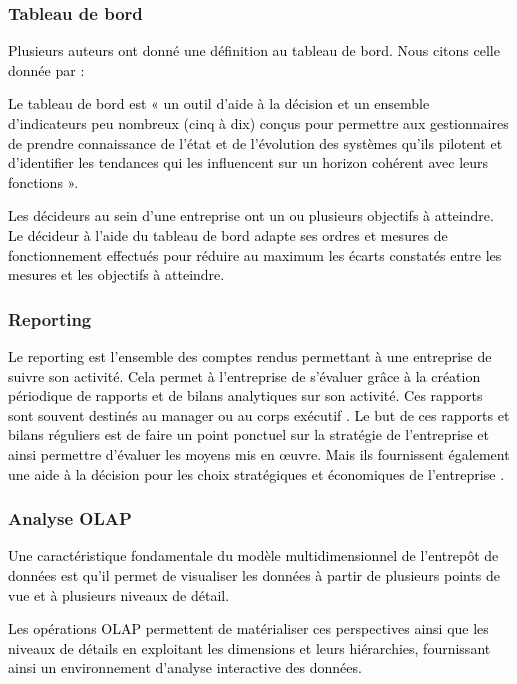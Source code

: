 \documentclass[a4paper,12pt]{report}
\begin{document}
\subsubsection{Tableau de bord}
\textcolor{black}{Plusieurs auteurs ont donné une définition au tableau de bord. Nous citons celle donnée par \citep{berland2004mesurer}:}

\textcolor{black}{Le tableau de bord est « un outil d’aide à la décision et  un ensemble d’indicateurs peu nombreux (cinq à dix) conçus pour permettre aux gestionnaires de prendre connaissance de  l’état et de l’évolution des  systèmes qu’ils pilotent et d’identifier les tendances qui les  influencent sur un horizon cohérent avec leurs fonctions ».}

\textcolor{black}{Les décideurs au sein d’une entreprise ont un ou plusieurs objectifs à atteindre. Le décideur à l’aide du tableau de bord adapte ses ordres et mesures de fonctionnement effectués pour réduire au maximum les écarts constatés entre les mesures et les objectifs à atteindre.}

\subsubsection{Reporting}
\textcolor{black}{Le reporting est l’ensemble des comptes rendus permettant à une entreprise de suivre  son activité. Cela permet à l’entreprise de s’évaluer grâce à la création périodique de  rapports et de bilans analytiques sur son activité. Ces rapports sont souvent destinés au  manager ou au corps exécutif \citep{polet12infor}.}
\textcolor{black}{Le but de ces rapports et bilans réguliers est de faire un point ponctuel sur la  stratégie de l’entreprise et ainsi permettre d’évaluer les moyens mis en œuvre. Mais ils fournissent également une aide à la décision pour les choix stratégiques et économiques de l’entreprise \citep{polet12infor}.}
\subsubsection{Analyse OLAP }
\textcolor{black}{Une caractéristique fondamentale du modèle multidimensionnel de l’entrepôt de données est qu'il permet de visualiser les données à partir de plusieurs points de vue et à plusieurs niveaux de détail.}

\textcolor{black}{Les opérations OLAP permettent de matérialiser ces perspectives ainsi que les niveaux de détails en exploitant les dimensions et leurs hiérarchies, fournissant ainsi un environnement d'analyse interactive des données.}
\end{document}
